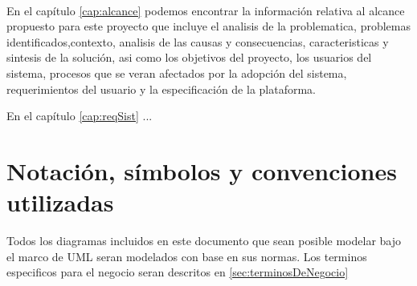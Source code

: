 \\
	En el capítulo \ref{cap:alcance} podemos encontrar la información relativa al alcance propuesto para este proyecto que incluye el analisis de la problematica, problemas identificados,contexto, analisis de las causas y consecuencias, caracteristicas y sintesis de la solución, asi como los objetivos del proyecto, los usuarios del sistema, procesos que se veran afectados por la adopción del sistema, requerimientos del usuario y la especificación de la plataforma.
	
	En el capítulo \ref{cap:reqSist} ...

\section{Notación, símbolos y convenciones utilizadas}

Todos los diagramas incluidos en este documento que sean posible modelar bajo el marco de UML seran modelados con base en sus normas.
Los terminos especificos para el negocio seran descritos en \ref{sec:terminosDeNegocio}
